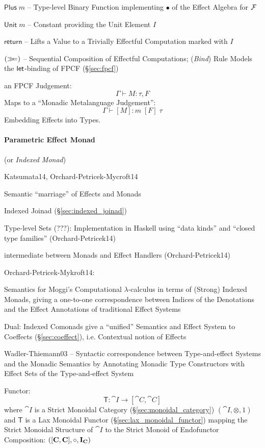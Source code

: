 $\mathsf{Plus}\;m$ -- Type-level Binary Function implementing $\bullet$
of the Effect Algebra for $\mathcal{F}$

$\mathsf{Unit}\;m$ -- Constant providing the Unit Element $I$

$\mathsf{return}$ -- Lifts a Value to a Trivially Effectful
Computation marked with $I$

$(\mathsf{\gg\kern-3pt=})$ -- Sequential Composition of Effectful Computations;
(\emph{Bind}) Rule Models the $\mathsf{let}$-binding of FPCF
(\S\ref{sec:fpcf})

an FPCF Judgement:
\[
  \Gamma \vdash M:\tau,F
\]
Maps to a ``Monadic Metalanguage Judgement'': %
\[
  \Gamma \vdash [M]:m\;[F]\;\tau
\]
Embedding Effects into Types. \cite{wadler-thiemann03}




\paragraph{Parametric Effect Monad}
\label{sec:parametric_effect_monad} \hfill

(or \emph{Indexed Monad})

Katsumata14, Orchard-Petricek-Mycroft14

Semantic ``marriage'' of Effects and Monads

Indexed Joinad (\S\ref{sec:indexed_joinad})

Type-level Sets (???): Implementation in Haskell using ``data kinds''
and ``closed type families'' (Orchard-Petricek14) %

intermediate between Monads and Effect Handlers (Orchard-Petricek14)


Orchard-Petricek-Mykroft14:

Semantics for Moggi's Computational $\lambda$-calculus in terms of
(Strong) Indexed Monads, giving a one-to-one correspondence between
Indices of the Denotations and the Effect Annotations of traditional
Effect Systems

Dual: Indexed Comonads give a ``unified'' Semantics and Effect System
to Coeffects (\S\ref{sec:coeffect}), i.e. Contextual notion of Effects

Wadler-Thiemann03 -- Syntactic correspondence between Type-and-effect
Systems and the Monadic Semantics by Annotating Monadic Type
Constructors with Effect Sets of the Type-and-effect System

Functor:
\[
  \mathsf{T} : \cat{I} \rightarrow [\cat{C},\cat{C}]
\]
where $\cat{I}$ is a Strict Monoidal Category
(\S\ref{sec:monoidal_category}) $(\cat{I}, \otimes, 1)$ and
$\mathsf{T}$ is a Lax Monoidal Functor
(\S\ref{sec:lax_monoidal_functor}) mapping the Strict Monoidal
Structure of $\cat{I}$ to the Strict Monoid of Endofunctor
Composition: $([\mathbf{C},\mathbf{C}],\circ,\mathbf{I}_\mathbf{C})$



